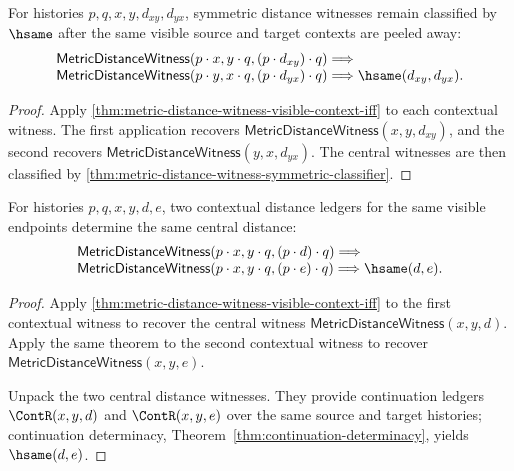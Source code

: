 \begin{theorem}
\label{thm:metric-distance-witness-visible-context-symmetric-classifier}
For histories $p,q,x,y,d_{xy},d_{yx}$, symmetric distance witnesses remain
classified by $\hsame$ after the same visible source and target contexts are
peeled away:
$$
\begin{array}{l}
\mathsf{MetricDistanceWitness}(p\cdot x,y\cdot q,(p\cdot d_{xy})\cdot q)
\Longrightarrow
\\
\mathsf{MetricDistanceWitness}(p\cdot y,x\cdot q,(p\cdot d_{yx})\cdot q)
\Longrightarrow
\hsame(d_{xy},d_{yx}).
\end{array}
$$
\end{theorem}
\begin{proof}
Apply \autoref{thm:metric-distance-witness-visible-context-iff} to each
contextual witness. The first application recovers
$\mathsf{MetricDistanceWitness}(x,y,d_{xy})$, and the second recovers
$\mathsf{MetricDistanceWitness}(y,x,d_{yx})$. The central witnesses are then
classified by \autoref{thm:metric-distance-witness-symmetric-classifier}.
\end{proof}

\begin{theorem}
\label{thm:metric-distance-witness-visible-context-determinacy}
For histories $p,q,x,y,d,e$, two contextual distance ledgers for the same
visible endpoints determine the same central distance:
$$
\begin{array}{l}
\mathsf{MetricDistanceWitness}(p\cdot x,y\cdot q,(p\cdot d)\cdot q)
\Longrightarrow
\\
\mathsf{MetricDistanceWitness}(p\cdot x,y\cdot q,(p\cdot e)\cdot q)
\Longrightarrow
\hsame(d,e).
\end{array}
$$
\end{theorem}
\begin{proof}
Apply \autoref{thm:metric-distance-witness-visible-context-iff} to the first
contextual witness to recover the central witness
$\mathsf{MetricDistanceWitness}(x,y,d)$. Apply the same theorem to the second
contextual witness to recover
$\mathsf{MetricDistanceWitness}(x,y,e)$.

Unpack the two central distance witnesses. They provide continuation ledgers
$\ContR(x,y,d)$ and $\ContR(x,y,e)$ over the same source and target histories;
continuation determinacy, Theorem~\ref{thm:continuation-determinacy}, yields
$\hsame(d,e)$.
\end{proof}
